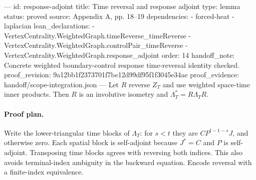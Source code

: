 ---
id: response-adjoint
title: Time reversal and response adjoint
type: lemma
status: proved
source: Appendix A, pp. 18–19
dependencies:
- forced-heat
- laplacian
lean_declarations:
- VertexCentrality.WeightedGraph.timeReverse_timeReverse
- VertexCentrality.WeightedGraph.controlPair_timeReverse
- VertexCentrality.WeightedGraph.response_adjoint
order: 14
handoff_note: Concrete weighted boundary-control response time-reversal identity checked.
proof_revision: 9a12bb1f2373701f7be12d99df95f1f3045e34ae
proof_evidence: handoff/scope-integration.json
---
Let $R$ reverse $Z_T$ and use weighted space-time inner products. Then $R$ is an involutive isometry and $\Lambda_T^*=R\Lambda_TR$.

\paragraph{Proof plan.}
Write the lower-triangular time blocks of $\Lambda_T$: for $s<t$ they are $CP^{t-1-s}J$, and otherwise zero. Each spatial block is self-adjoint because $J^*=C$ and $P$ is self-adjoint. Transposing time blocks agrees with reversing both indices. This also avoids terminal-index ambiguity in the backward equation. Encode reversal with a finite-index equivalence.
